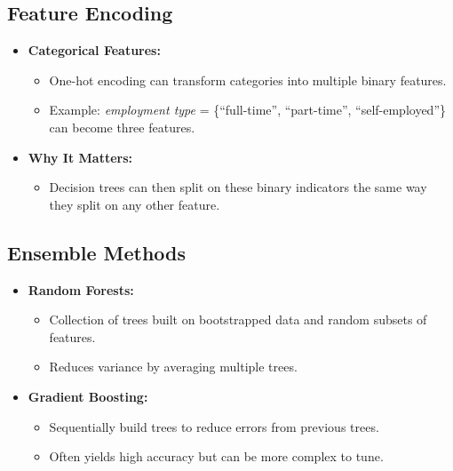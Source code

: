 \documentclass[10pt]{article}
\begin{document}
\subsection{Feature Encoding}
\begin{itemize}
    \item \textbf{Categorical Features:}
    \begin{itemize}
        \item One-hot encoding can transform categories into multiple binary features.
        \item Example: \textit{employment type} = \{``full-time'', ``part-time'', ``self-employed''\} can become three features.
    \end{itemize}
    \item \textbf{Why It Matters:}
    \begin{itemize}
        \item Decision trees can then split on these binary indicators the same way they split on any other feature.
    \end{itemize}
\end{itemize}

\subsection{Ensemble Methods}
\begin{itemize}
    \item \textbf{Random Forests:}
    \begin{itemize}
        \item Collection of trees built on bootstrapped data and random subsets of features.
        \item Reduces variance by averaging multiple trees.
    \end{itemize}
    \item \textbf{Gradient Boosting:}
    \begin{itemize}
        \item Sequentially build trees to reduce errors from previous trees.
        \item Often yields high accuracy but can be more complex to tune.
    \end{itemize}
\end{itemize}
\end{document}

